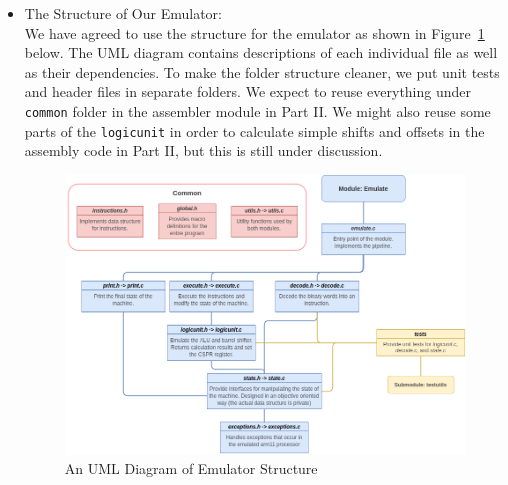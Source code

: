 \documentclass[12pt]{article}
\begin{document}
\begin{itemize}
  \item The Structure of Our Emulator:\\
  We have agreed to use the structure for the emulator as shown in Figure~\ref{part1:UML} below. The UML diagram contains descriptions of each individual file as well as their dependencies. To make the folder structure cleaner, we put unit tests and header files in separate folders. We expect to reuse everything under \texttt{common} folder in the assembler module in Part II. We might also reuse some parts of the \texttt{logicunit} in order to calculate simple shifts and offsets in the assembly code in Part II, but this is still under discussion.
  \begin{figure}[!ht]
  \centering
  \includegraphics[scale = 0.5]{project_structure_interim.png}
  \caption{An UML Diagram of Emulator Structure}
  \label{part1:UML}
  \end{figure}
  

\end{itemize}
\end{document}

